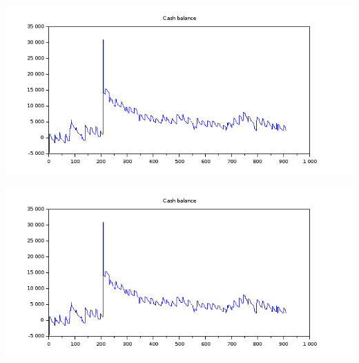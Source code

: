 \documentclass{article}
\begin{document}
\begin{minipage}{0.45\textwidth}
\includegraphics[scale=0.6]{Scilab-cashBalance.png}
\end{minipage}%
\hfill
\begin{minipage}{0.45\textwidth}
\includegraphics[scale=0.6]{Scilab-cashBalance.png}
\end{minipage}%
\end{document}
